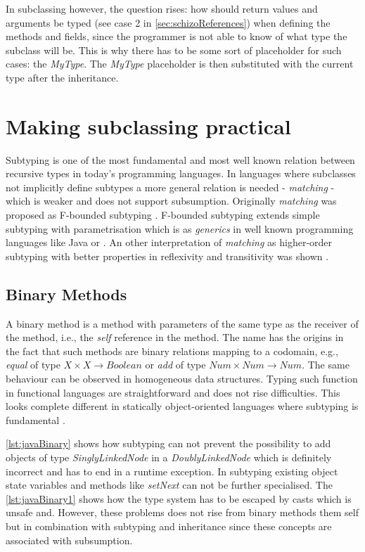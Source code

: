 In subclassing however, the question rises: how should return values
and arguments be typed (see case 2 in \ref{sec:schizoReferences})
when defining the methods and fields, since the programmer is not able
to know of what type the subclass will be. This is why there has to
be some sort of placeholder for such cases: the \emph{MyType}. The
\emph{MyType} placeholder is then substituted with the current type
after the inheritance.

\chapter{Making subclassing practical}
Subtyping is one of the most fundamental and most well known relation
between recursive types in today's programming languages. In languages
where subclasses not implicitly define subtypes a more general
relation is needed - \emph{matching} - which is weaker and does
not support subsumption. Originally \emph{matching} was proposed
as F-bounded subtyping \cite{canning_f-bounded_1989}. F-bounded
subtyping extends simple subtyping with parametrisation which is as
\emph{generics} in well known programming languages like Java or \CS
\cite{barron-estrada_inheritance_2003}. An other interpretation of
\emph{matching} as higher-order subtyping with better properties in
reflexivity and transitivity was shown \cite{abadi_subtyping_1996}.

\section{Binary Methods}
A binary method is a method with parameters of the same type as the
receiver of the method, i.e., the \emph{self} reference in the method. The
name has the origins in the fact that such methods are binary relations
mapping to a codomain, e.g., \emph{equal} of type $X \times X \rightarrow
Boolean$ or \emph{add} of type $Num \times Num \rightarrow Num$. The
same behaviour can be observed in homogeneous data structures. Typing
such function in functional languages are straightforward and does not
rise difficulties. This looks complete different in statically object-oriented
languages where subtyping is fundamental \cite{bruce_binary_1995}.

\autoref{lst:javaBinary} shows how subtyping can not prevent the
possibility to add objects of type \emph{SinglyLinkedNode} in a
\emph{DoublyLinkedNode} which is definitely incorrect and has to end
in a runtime exception. In subtyping existing object state variables
and methods like \emph{setNext} can not be further specialised. The
\autoref{lst:javaBinary1} shows how the type system has to be escaped
by casts which is unsafe and.	However, these problems does not rise
from binary methods them self but in combination with subtyping and
inheritance since these concepts are associated with subsumption.

